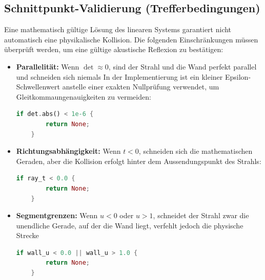 \documentclass{article}
\begin{document}
    \subsection{Schnittpunkt-Validierung (Trefferbedingungen)}\label{subsec:intersection-validation-(hit-conditions)}


    Eine mathematisch gültige Lösung des linearen Systems garantiert nicht automatisch eine physikalische Kollision.
    Die folgenden Einschränkungen müssen überprüft werden, um eine gültige akustische Reflexion zu bestätigen:
    \begin{itemize}
        \item \textbf{Parallelität:} Wenn $\det \approx 0$, sind der Strahl und die Wand perfekt parallel und schneiden sich niemals
        In der Implementierung ist ein kleiner Epsilon-Schwellenwert anstelle einer exakten Nullprüfung verwendet, um Gleitkommaungenauigkeiten zu vermeiden:

        \begin{lstlisting}[language=Rust]
    if det.abs() < 1e-6 {
        return None;
    }
        \end{lstlisting}

        \item \textbf{Richtungsabhängigkeit:} Wenn $t < 0$, schneiden sich die mathematischen Geraden, aber die Kollision erfolgt hinter dem Aussendungspunkt des Strahls:
        \begin{lstlisting}[language=Rust]
    if ray_t < 0.0 {
        return None;
    }
        \end{lstlisting}
        \item \textbf{Segmentgrenzen:} Wenn $u < 0$ oder $u > 1$, schneidet der Strahl zwar die unendliche Gerade, auf der die Wand liegt, verfehlt jedoch die physische Strecke
        \begin{lstlisting}[language=Rust]
    if wall_u < 0.0 || wall_u > 1.0 {
        return None;
    }
        \end{lstlisting}
    \end{itemize}
\end{document}
